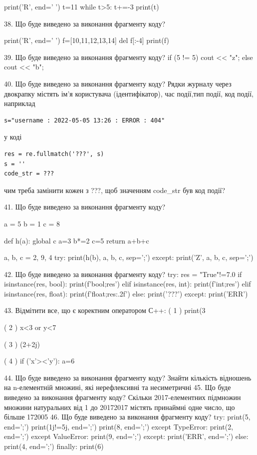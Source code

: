 \documentclass[11pt]{article}
\begin{document}
print('R', end=' ')
t=11
while t>5:
    t+=-3
print(t)


38. Що буде виведено за виконання фрагменту коду?

print('R', end=' ')
f=[10,11,12,13,14]
del f[:-4]
print(f)


39. Що буде виведено за виконання фрагменту коду?
if (5 != 5)
    cout << "z";
else
    cout << "b";


40. Що буде виведено за виконання фрагменту коду?
Рядки журналу через двокрапку містять ім'я користувача (ідентифікатор), час події,тип події, код події, наприклад
\begin{verbatim}
s="username : 2022-05-05 13:26 : ERROR : 404"
\end{verbatim}
у коді 
\begin{verbatim}
res = re.fullmatch('???', s) 
s = ''
code_str = ??? 
\end{verbatim}
чим треба замінити кожен з ???, щоб значенням code\_str був код події? 



41. Що буде виведено за виконання фрагменту коду?

a = 5
b = 1
c = 8

def h(a):
global c    a=3
    b*=2
    c=5
    return a+b+c

a, b, c = 2, 9, 4
try:
    print(h(b), a, b, c, sep=';')
except:
    print('Z', a, b, c, sep=';')

42. Що буде виведено за виконання фрагменту коду?
try:
    res = "True"!=7.0
    if isinstance(res, bool):
        print(f'bool;{res}')
    elif isinstance(res, int):
        print(f'int;{res}')
    elif isinstance(res, float):
        print(f'float;{res:.2f}')
    else:
        print('???')
except:
    print('ERR')

43. %
Відмітити все, що є коректним оператором С++:
( 1 ) print(3%

( 2 ) x<3 or y<7

( 3 ) (2+2j)%

( 4 ) if ('x'><'y'): a=6

44. Що буде виведено за виконання фрагменту коду?
Знайти кількість відношень на n-елементній множині, які нерефлексивні та несиметричні
45. Що буде виведено за виконання фрагменту коду?
Скільки 2017-елементних підмножин множини натуральних від 1 до 20172017 містять принаймні одне число, що більше 172005
46. Що буде виведено за виконання фрагменту коду?
try:
    print(5, end=';')
    print(1j!=5j, end=';')
    print(8, end=';')
except TypeError:
    print(2, end=';')
except ValueError:
    print(9, end=';')
except:
    print('ERR', end=';')
else:
    print(4, end=';')
finally:
    print(6)
\end{document}
